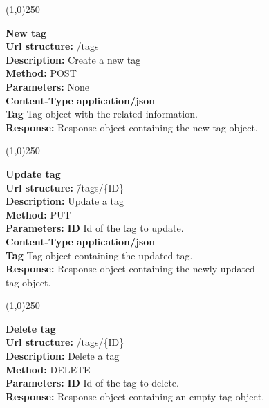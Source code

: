 \documentclass[11pt]{article}
\begin{document}
\begin{center}\line(1,0){250}\end{center}

\begin{tabbing}
\textbf{New tag} \\
\textcolor{black!60}{\textbf{Url structure:}} \hspace{0.2in} \= /tags \\
\textcolor{black!60}{\textbf{Description:}}  \> Create a new tag \\
\textcolor{black!60}{\textbf{Method:}} \> POST \\
\textcolor{black!60}{\textbf{Parameters:}} \> None \\
\textcolor{black!60}{\textbf{Content-Type}} \> \textbf{application/json} \\
\> \textbf{Tag} Tag object with the related information. \\
\textcolor{black!60}{\textbf{Response:}} \> Response object containing the new tag object.
\end{tabbing}

\begin{center}\line(1,0){250}\end{center}

\begin{tabbing}
\textbf{Update tag} \\
\textcolor{black!60}{\textbf{Url structure:}} \hspace{0.2in} \= /tags/\{ID\} \\
\textcolor{black!60}{\textbf{Description:}}  \> Update a tag \\
\textcolor{black!60}{\textbf{Method:}} \> PUT \\
\textcolor{black!60}{\textbf{Parameters:}} \> \textbf{ID} Id of the tag to update. \\
\textcolor{black!60}{\textbf{Content-Type}} \> \textbf{application/json} \\
\> \textbf{Tag} Tag object containing the updated tag.\\
\textcolor{black!60}{\textbf{Response:}} \> Response object containing the newly updated \\ \> tag object.
\end{tabbing}

\begin{center}\line(1,0){250}\end{center}

\begin{tabbing}
\textbf{Delete tag} \\
\textcolor{black!60}{\textbf{Url structure:}} \hspace{0.2in} \= /tags/\{ID\} \\
\textcolor{black!60}{\textbf{Description:}}  \> Delete a tag \\
\textcolor{black!60}{\textbf{Method:}} \> DELETE \\
\textcolor{black!60}{\textbf{Parameters:}} \> \textbf{ID} Id of the tag to delete. \\
\textcolor{black!60}{\textbf{Response:}} \> Response object containing an empty tag object.
\end{tabbing}
\end{document}
